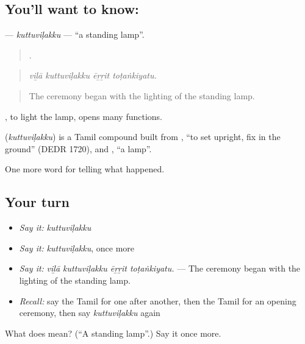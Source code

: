 \subsection*{You'll want to know: }
\textbf{} — \emph{kuttuviḷakku} — \textquotedblleft{}a standing lamp\textquotedblright{}.

\begin{quote}
   .
\end{quote}

\begin{quote}
\emph{viḻā kuttuviḷakku ēṟṟit toṭaṅkiyatu.}
\end{quote}

\begin{quote}
The ceremony began with the lighting of the standing lamp.
\end{quote}

 , to light the lamp, opens many functions.

\begin{cousinweb}
\textbf{} (\emph{kuttuviḷakku}) is a Tamil compound built from , \textquotedblleft{}to set upright, fix in the ground\textquotedblright{} (DEDR 1720), and , \textquotedblleft{}a lamp\textquotedblright{}.
\end{cousinweb}

\begin{grammarlens}[title={What you've built}]
One more word for telling what happened.
\end{grammarlens}

\subsection*{Your turn}
\begin{itemize}
\raggedright
  \item \emph{Say it:} \emph{kuttuviḷakku}
  \item \emph{Say it:} \emph{kuttuviḷakku}, once more
  \item \emph{Say it:} \emph{viḻā kuttuviḷakku ēṟṟit toṭaṅkiyatu.} — The ceremony began with the lighting of the standing lamp.
  \item \emph{Recall:} say the Tamil for one after another, then the Tamil for an opening ceremony, then say \emph{kuttuviḷakku} again
\end{itemize}

\begin{tcolorbox}[breakable,colback=teal!4,colframe=teal!35!black,title={Before you move on}]
What does  mean? (\textquotedblleft{}A standing lamp\textquotedblright{}.) Say it once more.
\end{tcolorbox}
